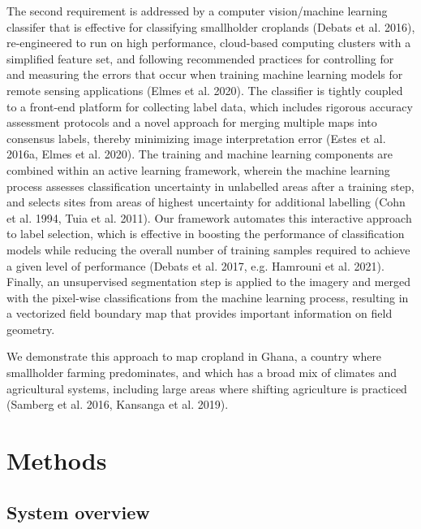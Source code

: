 \documentclass[11pt,a4paper]{article}
\begin{document}
The second requirement is addressed by a computer vision/machine
learning classifer that is effective for classifying smallholder
croplands (Debats et al. 2016), re-engineered to run on high
performance, cloud-based computing clusters with a simplified feature
set, and following recommended practices for controlling for and
measuring the errors that occur when training machine learning models
for remote sensing applications (Elmes et al. 2020). The classifier is
tightly coupled to a front-end platform for collecting label data, which
includes rigorous accuracy assessment protocols and a novel approach for
merging multiple maps into consensus labels, thereby minimizing image
interpretation error (Estes et al. 2016a, Elmes et al. 2020). The
training and machine learning components are combined within an active
learning framework, wherein the machine learning process assesses
classification uncertainty in unlabelled areas after a training step,
and selects sites from areas of highest uncertainty for additional
labelling (Cohn et al. 1994, Tuia et al. 2011). Our framework automates
this interactive approach to label selection, which is effective in
boosting the performance of classification models while reducing the
overall number of training samples required to achieve a given level of
performance (Debats et al. 2017, e.g. Hamrouni et al. 2021). Finally, an
unsupervised segmentation step is applied to the imagery and merged with
the pixel-wise classifications from the machine learning process,
resulting in a vectorized field boundary map that provides important
information on field geometry.

We demonstrate this approach to map cropland in Ghana, a country where
smallholder farming predominates, and which has a broad mix of climates
and agricultural systems, including large areas where shifting
agriculture is practiced (Samberg et al. 2016, Kansanga et al. 2019).

\hypertarget{methods}{%
\section{Methods}\label{methods}}

\hypertarget{system-overview}{%
\subsection{System overview}\label{system-overview}}
\end{document}
